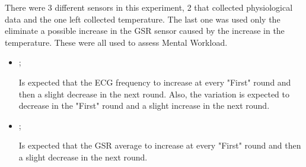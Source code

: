 There were 3 different sensors in this experiment, 2 that collected physiological data and the one left collected temperature. The last one was used only the eliminate a possible increase in the GSR sensor caused by the increase in the temperature. These were all used to assess Mental Workload.

\begin{itemize}
    \item {};
    
        Is expected that the ECG frequency to increase at every "First" round and then a slight decrease in the next round. Also, the variation is expected to decrease in the "First" round and a slight increase in the next round.

    \item {};
    
        Is expected that the GSR average to increase at every "First" round and then a slight decrease in the next round.

\end{itemize}


